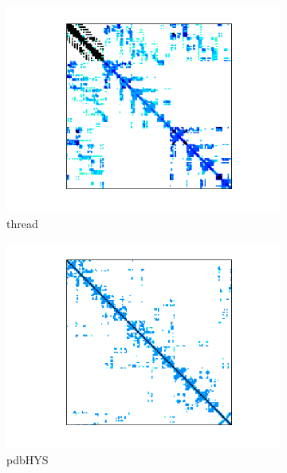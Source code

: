 \begin{figure}[H]
\begin{subfigure}[b]{0.3\textwidth}
        \includegraphics[width=\textwidth]{./images/CG/thread.png}
        \caption{thread}
    \end{subfigure}
    \quad 
    \begin{subfigure}[b]{0.3\textwidth}
        \includegraphics[width=\textwidth]{./images/CG/pdb1HYS.png}
        \caption{pdbHYS}
    \end{subfigure}
    \quad 
    \begin{subfigure}[b]{0.3\textwidth}

\end{subfigure}
\end{figure}
